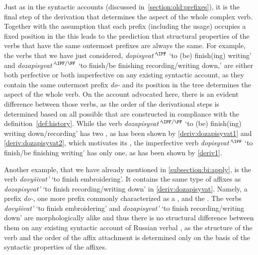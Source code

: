 Just as in the syntactic accounts (discussed in~\ref{section:old:prefixes}), it is the final step of the derivation that determines the aspect of the whole complex verb. Together with the assumption that each prefix (including the usage) occupies a fixed position in the  this leads to the prediction that structural properties of the verbs that have the same outermost prefixes are always the same. For example, the verbs that we have just considered, \textit{dopisyvat'}$^\IPF$ `to (be) finish(ing) writing' and \textit{dozapisyvat'}$^{\IPF/\PF}$ `to finish/be finishing recording/writing down,' are either both perfective or both imperfective on any existing syntactic  account, as they contain the same outermost prefix \textit{do-} and its position in the tree determines the aspect of the whole verb. On the account advocated here, there is an evident difference between those verbs, as the order of the derivational steps is determined based on all possible  that are constructed in compliance with the definition~\ref{def:history}. While the verb \textit{dozapisyvat'}$^{\IPF/\PF}$ `to (be) finish(ing) writing down/recording' has two , as has been shown by \ref{deriv:dozapisyvat1} and \ref{deriv:dozapisyvat2}, which motivates its , the imperfective verb \textit{dopisyvat'}$^\IPF$ `to finish/be finishing writing' has only one, as has been shown by \ref{deriv1}.

Another example, that we have already mentioned in \ref{subsection:bi:apply}, is the verb \textit{dovy\v{s}ivat'} `to finish embroidering'. It contains the same type of affixes as \textit{dozapisyvat'} `to finish recording/writing down' in \ref{deriv:dozapisyvat}. Namely, a  prefix \textit{do-}, one more prefix commonly characterized as a , and the . The verbs \textit{dovy\v{s}ivat'} `to finish embroidering' and \textit{dozapisyvat'} `to finish recording/writing down' are morphologically alike and thus there is no structural difference between them on any existing syntactic account of Russian verbal , as the structure of the verb and the order of the affix attachment is determined only on the basis of the syntactic properties of the affixes.
 

